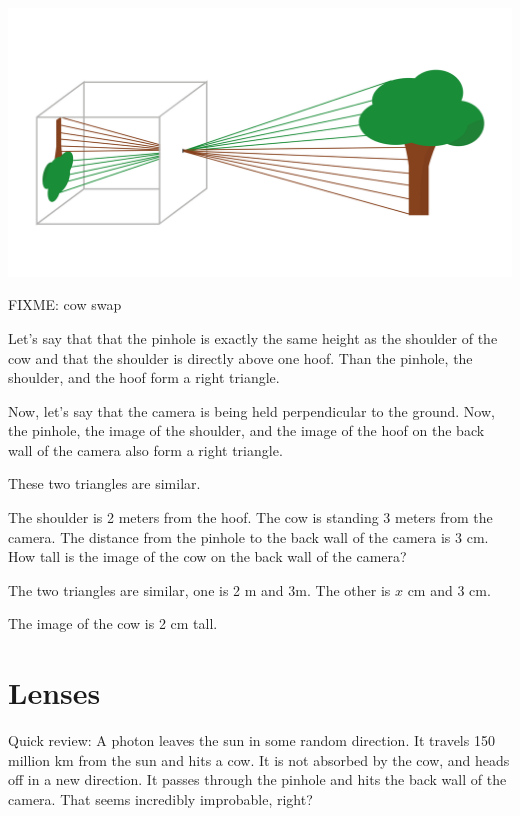 \includegraphics[width=1\textwidth]{pinhole.png}

\begin{Exercise}[title={Height of the image}, label=image_height]

FIXME: cow swap

Let's say that that the pinhole is exactly the same height as the
shoulder of the cow and that the shoulder is directly above one hoof.
Than the pinhole, the shoulder, and the hoof form a right triangle.

Now, let's say that the camera is being held perpendicular to the
ground.  Now, the pinhole, the image of the shoulder, and the image of
the hoof on the back wall of the camera also form a right triangle.

These two triangles are similar.

The shoulder is 2 meters from the hoof.  The cow is standing 3 meters
from the camera.  The distance from the pinhole to the back wall of
the camera is 3 cm.  How tall is the image of the cow on the back wall
of the camera?

\end{Exercise}
\begin{Answer}[ref=image_height]

The two triangles are similar, one is 2 m and 3m.  The other is $x$ cm and 3 cm.

The image of the cow is 2 cm tall.

\end{Answer}

\section{Lenses}

Quick review: A photon leaves the sun in some random direction. It
travels 150 million km from the sun and hits a cow.  It is not
absorbed by the cow, and heads off in a new direction.  It passes
through the pinhole and hits the back wall of the camera.  That seems
incredibly improbable, right?

